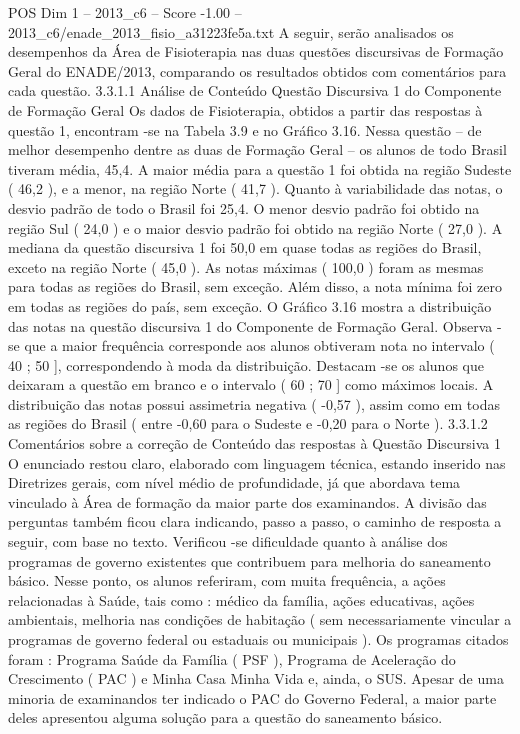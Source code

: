 \begin{textsample}{POS Dim 1 – 2013\_c6 – Score -1.00 – 2013\_c6/enade\_2013\_fisio\_a31223fe5a.txt}
A seguir, serão analisados os desempenhos da Área de Fisioterapia nas duas questões discursivas de Formação Geral do ENADE/2013, comparando os resultados obtidos com comentários para cada questão. 3.3.1.1 Análise de Conteúdo Questão Discursiva 1 do Componente de Formação Geral Os dados de Fisioterapia, obtidos a partir das respostas à questão 1, encontram -se na Tabela 3.9 e no Gráfico 3.16.
Nessa questão – de melhor desempenho dentre as duas de Formação Geral – os alunos de todo Brasil tiveram média, 45,4.
A maior média para a questão 1 foi obtida na região Sudeste ( 46,2 ), e a menor, na região Norte ( 41,7 ).
Quanto à variabilidade das notas, o desvio padrão de todo o Brasil foi 25,4.
O menor desvio padrão foi obtido na região Sul ( 24,0 ) e o maior desvio padrão foi obtido na região Norte ( 27,0 ).
A mediana da questão discursiva 1 foi 50,0 em quase todas as regiões do Brasil, exceto na região Norte ( 45,0 ).
As notas máximas ( 100,0 ) foram as mesmas para todas as regiões do Brasil, sem exceção.
Além disso, a nota mínima foi zero em todas as regiões do país, sem exceção.
O Gráfico 3.16 mostra a distribuição das notas na questão discursiva 1 do Componente de Formação Geral.
Observa -se que a maior frequência corresponde aos alunos obtiveram nota no intervalo ( 40 ; 50 ], correspondendo à moda da distribuição.
Destacam -se os alunos que deixaram a questão em branco e o intervalo ( 60 ; 70 ] como máximos locais.
A distribuição das notas possui assimetria negativa ( -0,57 ), assim como em todas as regiões do Brasil ( entre -0,60 para o Sudeste e -0,20 para o Norte ). 3.3.1.2 Comentários sobre a correção de Conteúdo das respostas à Questão Discursiva 1 O enunciado restou claro, elaborado com linguagem técnica, estando inserido nas Diretrizes gerais, com nível médio de profundidade, já que abordava tema vinculado à Área de formação da maior parte dos examinandos.
A divisão das perguntas também ficou clara indicando, passo a passo, o caminho de resposta a seguir, com base no texto.
Verificou -se dificuldade quanto à análise dos programas de governo existentes que contribuem para melhoria do saneamento básico.
Nesse ponto, os alunos referiram, com muita frequência, a ações relacionadas à Saúde, tais como : médico da família, ações educativas, ações ambientais, melhoria nas condições de habitação ( sem necessariamente vincular a programas de governo federal ou estaduais ou municipais ).
Os programas citados foram : Programa Saúde da Família ( PSF ), Programa de Aceleração do Crescimento ( PAC ) e Minha Casa Minha Vida e, ainda, o SUS.
Apesar de uma minoria de examinandos ter indicado o PAC do Governo Federal, a maior parte deles apresentou alguma solução para a questão do saneamento básico.

\end{textsample}
